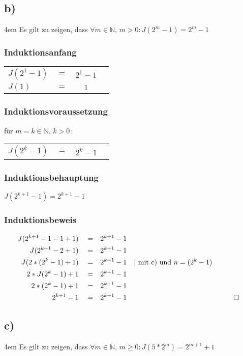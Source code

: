 \documentclass[titlepage]{article}
\begin{document}
		\subsection*{b)}
			\begingroup
			\leftskip4em
			Es gilt zu zeigen, dass $\forall m \in \mathbb{N},\,m > 0 : J(2^m-1)=2^m-1$
			\subsubsection*{Induktionsanfang}
			
				\begin{tabular}{lccl}
					$J(2^1-1)$ & $=$ & $2^1-1$ & \\
					$J(1)$ & $=$ & $1$ & \\
				\end{tabular}
		
			\subsubsection*{Induktionsvoraussetzung}
				für $m=k \in \mathbb{N},\,k > 0 \, :$
				\begin{tabular}{lccl}
					$J(2^k-1)$ & $=$ & $2^k-1$ & \\
				\end{tabular}
			\subsubsection*{Induktionsbehauptung}
					$J(2^{k+1}-1)=2^{k+1}-1$ 
			\subsubsection*{Induktionsbeweis}
				\begin{align*}
					J(2^{k+1}-1-1+1)&& &= &&2^{k+1}-1 \\
					J(2^{k+1}-2+1)&& &= &&2^{k+1}-1 \\
					J(2*(2^k-1)+1)&& &= &&2^{k+1}-1 && \text{| mit c) und } n=(2^k-1)\\
					2*J(2^k-1)+1&& &= &&2^{k+1}-1 \\
					2*(2^k-1)+1&& &= &&2^{k+1}-1 \\
					2^{k+1}-1&& &= && 2^{k+1}-1 && &&\qed
				\end{align*}
			
			\endgroup	
			
		\subsection*{c)}
			\begingroup
			\leftskip4em
			Es gilt zu zeigen, dass $\forall m \in \mathbb{N},\,m \ge 0 : J(5*2^m)=2^{m+1}+1$
\end{document}
